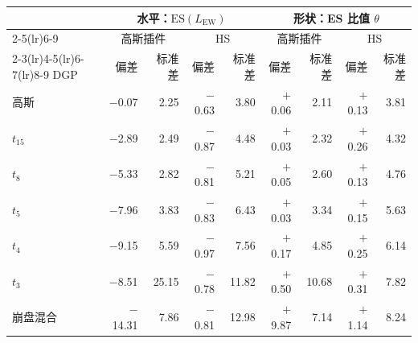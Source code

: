 \begin{tabular}{lrrrrrrrr}
\toprule
 & \multicolumn{4}{c}{水平：$\mathrm{ES}(L_{\mathrm{EW}})$} & \multicolumn{4}{c}{形状：ES 比值 $\theta$} \\
\cmidrule(lr){2-5}\cmidrule(lr){6-9}
 & \multicolumn{2}{c}{高斯插件} & \multicolumn{2}{c}{HS} & \multicolumn{2}{c}{高斯插件} & \multicolumn{2}{c}{HS} \\
\cmidrule(lr){2-3}\cmidrule(lr){4-5}\cmidrule(lr){6-7}\cmidrule(lr){8-9}
DGP & 偏差 & 标准差 & 偏差 & 标准差 & 偏差 & 标准差 & 偏差 & 标准差 \\
\midrule
高斯 & $-$0.07 & 2.25 & $-$0.63 & 3.80 & $+$0.06 & 2.11 & $+$0.13 & 3.81 \\
$t_{15}$ & $-$2.89 & 2.49 & $-$0.87 & 4.48 & $+$0.03 & 2.32 & $+$0.26 & 4.32 \\
$t_8$ & $-$5.33 & 2.82 & $-$0.81 & 5.21 & $+$0.05 & 2.60 & $+$0.13 & 4.76 \\
$t_5$ & $-$7.96 & 3.83 & $-$0.83 & 6.43 & $+$0.03 & 3.34 & $+$0.15 & 5.63 \\
$t_4$ & $-$9.15 & 5.59 & $-$0.97 & 7.56 & $+$0.17 & 4.85 & $+$0.25 & 6.14 \\
$t_3$ & $-$8.51 & 25.15 & $-$0.78 & 11.82 & $+$0.50 & 10.68 & $+$0.31 & 7.82 \\
崩盘混合 & $-$14.31 & 7.86 & $-$0.81 & 12.98 & $+$9.87 & 7.14 & $+$1.14 & 8.24 \\
\bottomrule
\end{tabular}